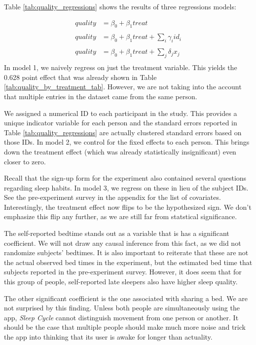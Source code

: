 \documentclass[12pt,]{article}
\begin{document}
Table \ref{tab:quality_regressions} shows the results of three
regressions models:

\[
\begin{aligned}
    quality &= \beta_0 + \beta_1 treat \\\\
    quality &= \beta_0 + \beta_1 treat + \sum_i \gamma_i id_i \\\\
    quality &= \beta_0 + \beta_1 treat + \sum_j \delta_j x_j \\
\end{aligned}
\] In model 1, we naively regress on just the treatment variable. This
yields the 0.628 point effect that was already shown in Table
\ref{tab:quality_by_treatment_tab}. However, we are not taking into the
account that multiple entries in the dataset came from the same person.

We assigned a numerical ID to each participant in the study. This
provides a unique indicator variable for each person and the standard
errors reported in Table \ref{tab:quality_regressions} are actually
clustered standard errors based on those IDs. In model 2, we control for
the fixed effects to each person. This brings down the treatment effect
(which was already statistically insignificant) even closer to zero.

Recall that the sign-up form for the experiment also contained several
questions regarding sleep habits. In model 3, we regress on these in
lieu of the subject IDs. See the pre-experiment survey in the appendix
for the list of covariates. Interestingly, the treatment effect now
flips to be the hypothesized sign. We don't emphasize this flip any
further, as we are still far from statstical significance.

The self-reported bedtime stands out as a variable that is has a
significant coefficient. We will not draw any causal inference from this
fact, as we did not randomize subjects' bedtimes. It is also important
to reiterate that these are not the actual observed bed times in the
experiment, but the estimated bed time that subjects reported in the
pre-experiment survey. However, it does seem that for this group of
people, self-reported late sleepers also have higher sleep quality.

The other significant coefficient is the one associated with sharing a
bed. We are not surprised by this finding. Unless both people are
simultaneously using the app, \emph{Sleep Cycle} cannot distinguish
movement from one person or another. It should be the case that multiple
people should make much more noise and trick the app into thinking that
its user is awake for longer than actuality.
\end{document}
